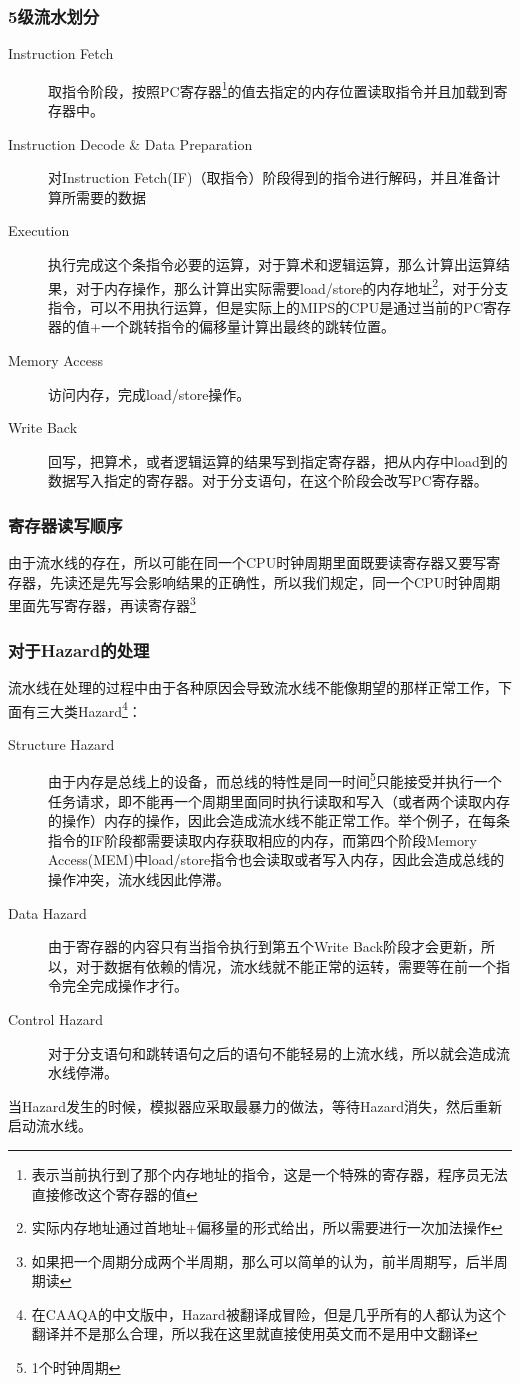 \documentclass[a4paper, 11pt]{article}
\begin{document}
\subsubsection{5级流水划分}
	\begin{description}
		\item[Instruction Fetch] 取指令阶段，按照PC寄存器\footnote{表示当前执行到了那个内存地址的指令，这是一个特殊的寄存器，程序员无法直接修改这个寄存器的值}的值去指定的内存位置读取指令并且加载到寄存器中。
		\item[Instruction Decode \& Data Preparation] 对Instruction Fetch(IF)（取指令）阶段得到的指令进行解码，并且准备计算所需要的数据
		\item[Execution] 执行完成这个条指令必要的运算，对于算术和逻辑运算，那么计算出运算结果，对于内存操作，那么计算出实际需要load/store的内存地址\footnote{实际内存地址通过首地址+偏移量的形式给出，所以需要进行一次加法操作}，对于分支指令，可以不用执行运算，但是实际上的MIPS的CPU是通过当前的PC寄存器的值+一个跳转指令的偏移量计算出最终的跳转位置。
		\item[Memory Access] 访问内存，完成load/store操作。
		\item[Write Back] 回写，把算术，或者逻辑运算的结果写到指定寄存器，把从内存中load到的数据写入指定的寄存器。对于分支语句，在这个阶段会改写PC寄存器。
	\end{description}
\subsubsection{寄存器读写顺序}
	由于流水线的存在，所以可能在同一个CPU时钟周期里面既要读寄存器又要写寄存器，先读还是先写会影响结果的正确性，所以我们规定，同一个CPU时钟周期里面先写寄存器，再读寄存器\footnote{如果把一个周期分成两个半周期，那么可以简单的认为，前半周期写，后半周期读}
\subsubsection{对于Hazard的处理}
	流水线在处理的过程中由于各种原因会导致流水线不能像期望的那样正常工作，下面有三大类Hazard\footnote{在CAAQA的中文版中，Hazard被翻译成冒险，但是几乎所有的人都认为这个翻译并不是那么合理，所以我在这里就直接使用英文而不是用中文翻译}：
	\begin{description}
		\item[Structure Hazard] 由于内存是总线上的设备，而总线的特性是同一时间\footnote{1个时钟周期}只能接受并执行一个任务请求，即不能再一个周期里面同时执行读取和写入（或者两个读取内存的操作）内存的操作，因此会造成流水线不能正常工作。举个例子，在每条指令的IF阶段都需要读取内存获取相应的内存，而第四个阶段Memory Access(MEM)中load/store指令也会读取或者写入内存，因此会造成总线的操作冲突，流水线因此停滞。
		\item[Data Hazard] 由于寄存器的内容只有当指令执行到第五个Write Back阶段才会更新，所以，对于数据有依赖的情况，流水线就不能正常的运转，需要等在前一个指令完全完成操作才行。
		\item[Control Hazard] 对于分支语句和跳转语句之后的语句不能轻易的上流水线，所以就会造成流水线停滞。
	\end{description}
	当Hazard发生的时候，模拟器应采取最暴力的做法，等待Hazard消失，然后重新启动流水线。
\end{document}
